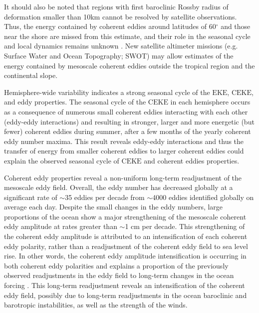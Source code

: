 \documentclass[draft,linenumbers]{agujournal2019}
\newcommand{\EKE}{\textrm{EKE}}
\newcommand{\CEKE}{\textrm{CEKE}}
\begin{document}
	It should also be noted that regions with first baroclinic Rossby radius of deformation smaller than 10km cannot be resolved by satellite observations. 
	Thus, the energy contained by coherent eddies around latitudes of 60$^\circ$ and those near the shore are missed from this estimate, and their role in the seasonal cycle and local dynamics remains unknown . New satellite altimeter missions (e.g. Surface Water and Ocean Topography; SWOT) may allow estimates of the energy contained by mesoscale coherent eddies outside the tropical region and the continental slope.

	Hemisphere-wide variability indicates a strong seasonal cycle of the $\EKE$, $\CEKE$, and eddy properties. 
	The seasonal cycle of the $\CEKE$ in each hemisphere occurs as a consequence of numerous small coherent eddies interacting with each other (eddy-eddy interactions) and resulting in stronger, larger and more energetic (but fewer) coherent eddies during summer, after a few months of the yearly coherent eddy number maxima.
	This result reveals eddy-eddy interactions and thus the transfer of energy from smaller coherent eddies to larger coherent eddies could explain the observed seasonal cycle of $\CEKE$ and coherent eddies properties.
	
	Coherent eddy properties reveal a non-uniform long-term readjustment of the mesoscale eddy field. 
	Overall, the eddy number has decreased globally at a significant rate of $\sim$35 eddies per decade from $\sim$4000 eddies identified globally on average each day. Despite the small changes in the eddy numbers, large proportions of the ocean show a major strengthening of the mesoscale coherent eddy amplitude at rates greater than $\sim$1 cm per decade.
	This strengthening of the coherent eddy amplitude is attributed to an intensification of each coherent eddy polarity, rather than a readjustment of the coherent eddy field to sea level rise. 
	In other words, the coherent eddy amplitude intensification is occurring in both coherent eddy polarities and explains a proportion of the previously observed readjustments in the eddy field to long-term changes in the ocean forcing \citep{Hu_acceleration_2020,Wunsch_speeding_2020,Martinez_Kinetic_2021}. 
	This long-term readjustment reveals an intensification of the coherent eddy field, possibly due to long-term readjustments in the ocean baroclinic and barotropic instabilities, as well as the strength of the winds.
	
\end{document}
